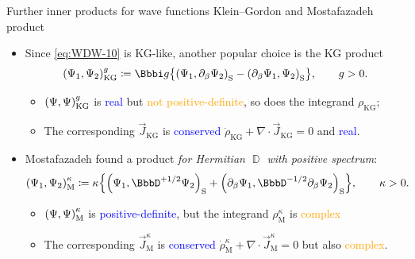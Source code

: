 \documentclass[9pt]{beamer}
\begin{document}
\begin{frame}%
{Further inner products for wave functions}%
{Klein--Gordon and Mostafazadeh product}
\begin{itemize}
\item Since \cref{eq:WDW-10} is KG-like, another popular choice is the KG 
product
\begin{align}
\rbr{\Psi_1,\Psi_2}_\text{KG}^g \coloneqq \ii g \cbr{
\rbr{\Psi_1,\partial_\beta\Psi_2}_\text{S} -
\rbr{\partial_\beta\Psi_1,\Psi_2}_\text{S}},\qquad g > 0.
\end{align}
\begin{itemize}
\item ${\left(\Psi,\Psi\right)}_\text{KG}^g$ is \textcolor{blue}{real} but
\textcolor{orange}{not positive-definite}, so does the integrand
$\rho_\text{KG}$;
\item The corresponding $\vec{J}_\text{KG}$ is
\textcolor{blue}{conserved} $\dot{\rho}_\text{KG} +
\nabla\cdot \vec{J}_\text{KG} = 0$ and \textcolor{blue}{real}.
\end{itemize}

\item Mostafazadeh found
a product \emph{for Hermitian $\BbbD$ with positive spectrum}:
\begin{align}
\rbr{\Psi_1,\Psi_2}_\text{M}^{\kappa} &\coloneqq\kappa\cbr{
\rbr{\Psi_1,\BbbD^{+1/2}\Psi_2}_\text{S}
+\rbr{\partial_\beta\Psi_1,
\BbbD^{-1/2}\partial_\beta\Psi_2}_\text{S}}, \qquad \kappa > 0.
\end{align}
\begin{itemize}
\item ${\left(\Psi,\Psi\right)}_\text{M}^{\kappa}$ is
\textcolor{blue}{positive-definite}, but the integrand $\rho_\text{M}^\kappa$
is \textcolor{orange}{complex}
\item The corresponding $\vec{J}_\text{M}^\kappa$ is
\textcolor{blue}{conserved} $\dot{\rho}_\text{M}^\kappa + 
\nabla\cdot \vec{J}_\text{M}^\kappa = 0$ but also \textcolor{orange}{complex}.
\end{itemize}
\end{itemize}
\end{frame}
\end{document}
